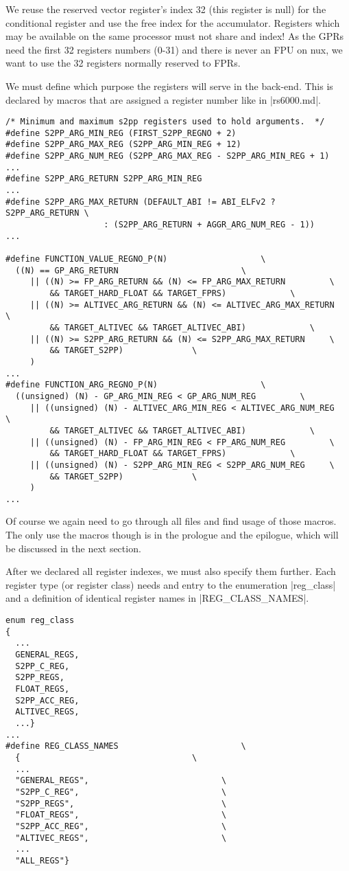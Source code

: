We reuse the reserved vector register's index 32 (this register is null) for the conditional register and use the free index for the accumulator.
Registers which may be available on the same processor must not share and index!
As the GPRs need the first 32 registers numbers (0-31) and there is never an FPU on nux, we want to use the 32 registers normally reserved to FPRs.

We must define which purpose the registers will serve in the back-end.
This is declared by macros that are assigned a register number like in |rs6000.md|.
\begin{lstlisting}
/* Minimum and maximum s2pp registers used to hold arguments.  */
#define S2PP_ARG_MIN_REG (FIRST_S2PP_REGNO + 2)
#define S2PP_ARG_MAX_REG (S2PP_ARG_MIN_REG + 12)
#define S2PP_ARG_NUM_REG (S2PP_ARG_MAX_REG - S2PP_ARG_MIN_REG + 1)
...
#define S2PP_ARG_RETURN S2PP_ARG_MIN_REG
...
#define S2PP_ARG_MAX_RETURN (DEFAULT_ABI != ABI_ELFv2 ? S2PP_ARG_RETURN \
                    : (S2PP_ARG_RETURN + AGGR_ARG_NUM_REG - 1))
...

#define FUNCTION_VALUE_REGNO_P(N)                   \
  ((N) == GP_ARG_RETURN                         \
     || ((N) >= FP_ARG_RETURN && (N) <= FP_ARG_MAX_RETURN         \
         && TARGET_HARD_FLOAT && TARGET_FPRS)             \
     || ((N) >= ALTIVEC_ARG_RETURN && (N) <= ALTIVEC_ARG_MAX_RETURN   \
         && TARGET_ALTIVEC && TARGET_ALTIVEC_ABI)             \
     || ((N) >= S2PP_ARG_RETURN && (N) <= S2PP_ARG_MAX_RETURN     \
         && TARGET_S2PP)              \
     )
...
#define FUNCTION_ARG_REGNO_P(N)                     \
  ((unsigned) (N) - GP_ARG_MIN_REG < GP_ARG_NUM_REG         \
     || ((unsigned) (N) - ALTIVEC_ARG_MIN_REG < ALTIVEC_ARG_NUM_REG   \
         && TARGET_ALTIVEC && TARGET_ALTIVEC_ABI)             \
     || ((unsigned) (N) - FP_ARG_MIN_REG < FP_ARG_NUM_REG         \
         && TARGET_HARD_FLOAT && TARGET_FPRS)             \
     || ((unsigned) (N) - S2PP_ARG_MIN_REG < S2PP_ARG_NUM_REG     \
         && TARGET_S2PP)              \
     )
...
\end{lstlisting}

Of course we again need to go through all files and find usage of those macros.
The only use the macros though is in the prologue and the epilogue, which will be discussed in the next section.

After we declared all register indexes, we must also specify them further.
Each register type (or register class) needs and entry to the enumeration |reg_class| and a definition of identical register names in |REG_CLASS_NAMES|.
\begin{lstlisting}
enum reg_class
{
  ...
  GENERAL_REGS,
  S2PP_C_REG,
  S2PP_REGS,
  FLOAT_REGS,
  S2PP_ACC_REG,
  ALTIVEC_REGS,
  ...}
...
#define REG_CLASS_NAMES                         \
  {                                   \
  ...
  "GENERAL_REGS",                           \
  "S2PP_C_REG",                             \
  "S2PP_REGS",                              \
  "FLOAT_REGS",                             \
  "S2PP_ACC_REG",                           \
  "ALTIVEC_REGS",                           \
  ...
  "ALL_REGS"}
  \end{lstlisting}\unsure{in columns?}


